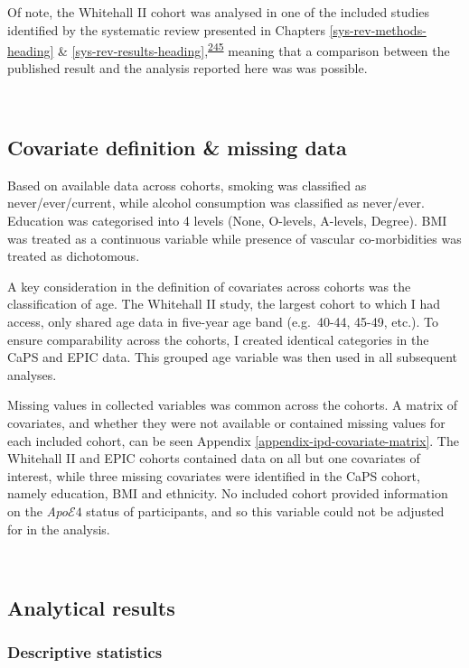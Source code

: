 \documentclass[a4paper, twoside]{templates/ociamthesis}
\begin{document}
Of note, the Whitehall II cohort was analysed in one of the included studies identified by the systematic review presented in Chapters \ref{sys-rev-methods-heading} \& \ref{sys-rev-results-heading},\textsuperscript{\protect\hyperlink{ref-tynkkynen2018}{245}} meaning that a comparison between the published result and the analysis reported here was was possible.

~

\hypertarget{ipd-covar-definition}{%
\subsection{Covariate definition \& missing data}\label{ipd-covar-definition}}

Based on available data across cohorts, smoking was classified as never/ever/current, while alcohol consumption was classified as never/ever. Education was categorised into 4 levels (None, O-levels, A-levels, Degree). BMI was treated as a continuous variable while presence of vascular co-morbidities was treated as dichotomous.

A key consideration in the definition of covariates across cohorts was the classification of age. The Whitehall II study, the largest cohort to which I had access, only shared age data in five-year age band (e.g.~40-44, 45-49, etc.). To ensure comparability across the cohorts, I created identical categories in the CaPS and EPIC data. This grouped age variable was then used in all subsequent analyses.

Missing values in collected variables was common across the cohorts. A matrix of covariates, and whether they were not available or contained missing values for each included cohort, can be seen Appendix \ref{appendix-ipd-covariate-matrix}. The Whitehall II and EPIC cohorts contained data on all but one covariates of interest, while three missing covariates were identified in the CaPS cohort, namely education, BMI and ethnicity. No included cohort provided information on the \emph{Apo}\(\mathcal{E}4\) status of participants, and so this variable could not be adjusted for in the analysis.

~

\hypertarget{analytical-results}{%
\subsection{Analytical results}\label{analytical-results}}

\hypertarget{descriptive-statistics}{%
\subsubsection{Descriptive statistics}\label{descriptive-statistics}}
\end{document}

